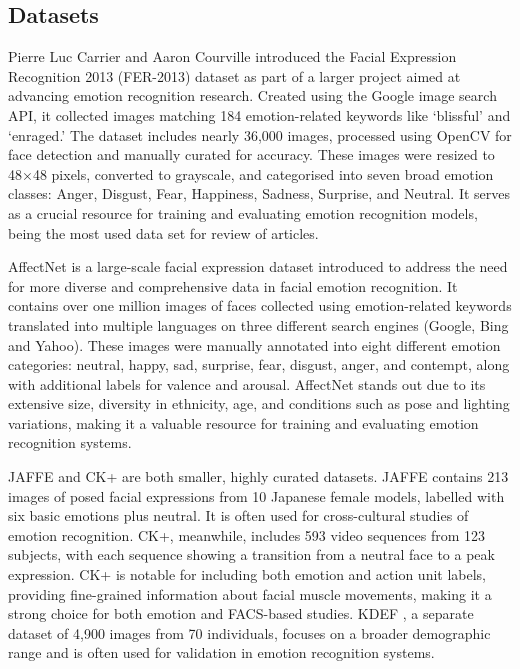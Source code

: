 \subsection{Datasets}
Pierre Luc Carrier and Aaron Courville \cite{Goodfellow2013-al} introduced the Facial Expression Recognition 2013 (FER-2013) dataset as part of a larger project aimed at advancing emotion recognition research. Created using the Google image search API, it collected images matching 184 emotion-related keywords like `blissful' and `enraged.' The dataset includes nearly 36,000 images, processed using OpenCV for face detection and manually curated for accuracy. These images were resized to 48\(\times\)48 pixels, converted to grayscale, and categorised into seven broad emotion classes: Anger, Disgust, Fear, Happiness, Sadness, Surprise, and Neutral.  It serves as a crucial resource for training and evaluating emotion recognition models, being the most used data set for review of articles.

AffectNet \cite{Mollahosseini2017-bj} is a large-scale facial expression dataset introduced to address the need for more diverse and comprehensive data in facial emotion recognition. It contains over one million images of faces collected using emotion-related keywords translated into multiple languages on three different search engines (Google, Bing and Yahoo). These images were manually annotated into eight different emotion categories: neutral, happy, sad, surprise, fear, disgust, anger, and contempt, along with additional labels for valence and arousal. AffectNet stands out due to its extensive size, diversity in ethnicity, age, and conditions such as pose and lighting variations, making it a valuable resource for training and evaluating emotion recognition systems.

JAFFE \cite{jaffe}  and CK+ are both smaller, highly curated datasets. JAFFE contains 213 images of posed facial expressions from 10 Japanese female models, labelled with six basic emotions plus neutral. It is often used for cross-cultural studies of emotion recognition. CK+, meanwhile, includes 593 video sequences from 123 subjects, with each sequence showing a transition from a neutral face to a peak expression. CK+ is notable for including both emotion and action unit labels, providing fine-grained information about facial muscle movements, making it a strong choice for both emotion and FACS-based studies. KDEF \cite{Lundqvist2015-in}, a separate dataset of 4,900 images from 70 individuals, focuses on a broader demographic range and is often used for validation in emotion recognition systems.

